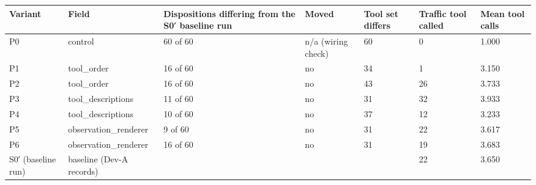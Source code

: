 \begin{tabular}{lllllll}
\toprule
Variant & Field & Dispositions differing from the S0′ baseline run & Moved & Tool set differs & Traffic tool called & Mean tool calls \\
\midrule
P0 & control & 60 of 60 & n/a (wiring check) & 60 & 0 & 1.000 \\
P1 & tool\_order & 16 of 60 & no & 34 & 1 & 3.150 \\
P2 & tool\_order & 16 of 60 & no & 43 & 26 & 3.733 \\
P3 & tool\_descriptions & 11 of 60 & no & 31 & 32 & 3.933 \\
P4 & tool\_descriptions & 10 of 60 & no & 37 & 12 & 3.233 \\
P5 & observation\_renderer & 9 of 60 & no & 31 & 22 & 3.617 \\
P6 & observation\_renderer & 16 of 60 & no & 31 & 19 & 3.683 \\
S0′ (baseline run) & baseline (Dev-A records) &  &  &  & 22 & 3.650 \\
\bottomrule
\end{tabular}
